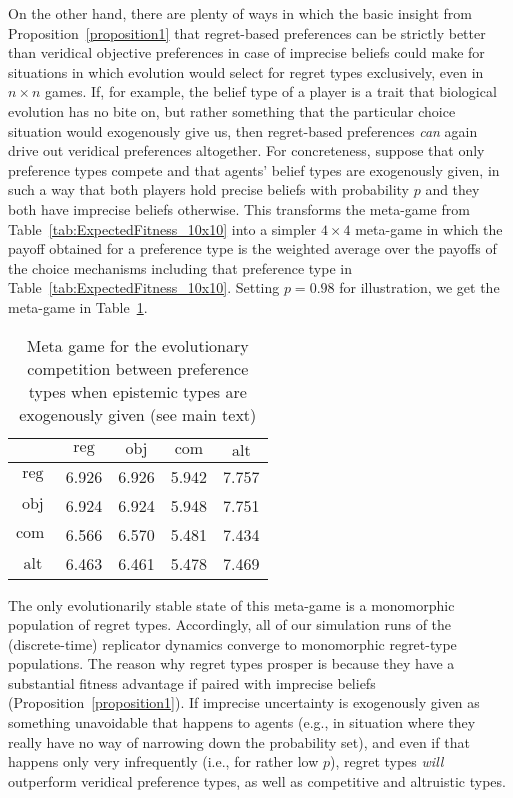 \documentclass[fleqn,reqno,11pt]{article}
\begin{document}
On the other hand, there are plenty of ways in which the basic insight from
Proposition~\ref{proposition1} that regret-based preferences can be strictly better than
veridical objective preferences in case of imprecise beliefs could make for situations in which
evolution would select for regret types exclusively, even in $n \times n$ games. If, for
example, the belief type of a player is a trait that biological evolution has no bite on, but rather
something that the particular choice situation would exogenously give us, then regret-based
preferences \emph{can} again drive out veridical preferences altogether. For concreteness,
suppose that only preference types compete and that agents' belief types are exogenously given,
in such a way that both players hold precise beliefs with probability $p$ and they both have imprecise
beliefs otherwise. This transforms the meta-game from Table~\ref{tab:ExpectedFitness_10x10} into a
simpler $4 \times 4$ meta-game in which the payoff obtained for a preference type is the weighted
average over the payoffs of the choice mechanisms including that preference type in
Table~\ref{tab:ExpectedFitness_10x10}. Setting $p = 0.98$ for illustration, we get the meta-game in Table~\ref{tab:ExogeneousEpistemics}.
\begin{table}[]
\centering
\begin{tabular}{ccccc}
  \toprule
  & $\text{reg}$ 
  & $\text{obj}$
  & $\text{com}$
  & $\text{alt}$ \\ 
  \midrule
  $\text{reg} $ & 6.926 & 6.926 & 5.942 & 7.757 \\ 
  $\text{obj} $ & 6.924 & 6.924 & 5.948 & 7.751 \\ 
  $\text{com }$ & 6.566 & 6.570 & 5.481 & 7.434 \\ 
  $\text{alt} $ & 6.463 & 6.461 & 5.478 & 7.469 \\ 
   \bottomrule
\end{tabular}
\caption{Meta game for the evolutionary competition between preference types when epistemic types are exogenously
  given (see main text)}
\label{tab:ExogeneousEpistemics}
\end{table}
The only evolutionarily stable state of this meta-game is a monomorphic population of regret types. Accordingly, all of
our simulation runs of the (discrete-time) replicator dynamics converge to monomorphic
regret-type populations. The reason why regret types prosper is because they have a substantial
fitness advantage if paired with imprecise beliefs (Proposition~\ref{proposition1}). If imprecise uncertainty is exogenously given
as something unavoidable that happens to agents (e.g., in situation where they really have no
way of narrowing down the probability set), and even if that happens only very infrequently
(i.e., for rather low $p$), regret types \emph{will} outperform veridical preference types, as
well as competitive and altruistic types.
\end{document}
